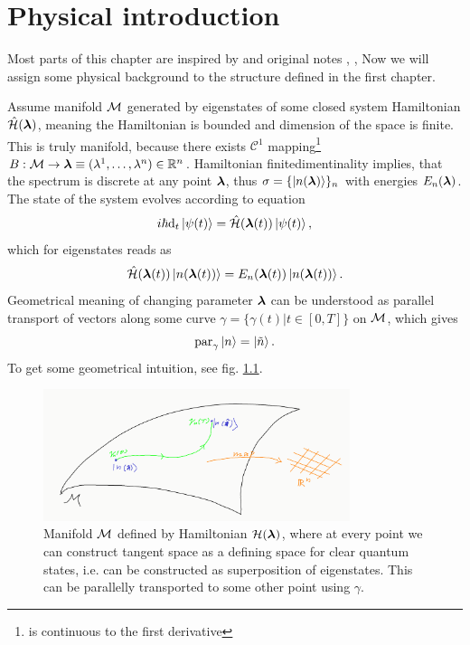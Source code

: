 \chapter{Physical introduction}
Most parts of this chapter are inspired by \citep{kolodrubez} and original notes \citep{berry1984}, \citep{berry1989}, \citep{berry2009}
Now we will assign some physical background to the structure defined in the first chapter.

Assume manifold $\mathcal{M}$ generated by eigenstates of some closed system Hamiltonian $\hat{\mathcal{H}}({\bm\lambda})$, meaning the Hamiltonian is bounded and dimension of the space is finite. This is truly manifold, because there exists $\mathcal{C}^1$ mapping\footnote{is continuous to the first derivative} $B: \mathcal{M}\rightarrow \bm{{\bm\lambda}}\equiv (\lambda^1,\dots,\lambda^n)\in\mathbb{R}^n$. Hamiltonian finitedimentinality implies, that the spectrum is discrete at any point ${\bm\lambda}$, thus $\sigma=\{\ket{n(\bm{{\bm\lambda}})}\}_n$ with energies $E_n(\bm{{\bm\lambda}})$. 
\citep{berry1984} The state of the system evolves according to \Schrodinger equation
\begin{equation}
    i\hbar \mathrm{d}_t\ket{\psi(t)} = \hat{\mathcal{H}}({\bm\lambda}(t))\ket{\psi(t)},
    \label{eq:schrodinger}
\end{equation}
which for eigenstates reads as
\begin{equation}
    \hat{\mathcal{H}}({\bm\lambda}(t))\ket{n({\bm\lambda}(t))}=E_n({\bm\lambda}(t))\ket{n({\bm\lambda}(t))}.
    \label{eq:energySchrodinger}
\end{equation}
Geometrical meaning of changing parameter ${\bm\lambda}$ can be understood as parallel transport of vectors along some curve $\gamma=\{\gamma(t)| t\in[0,T]\}$ on $\mathcal{M}$, which gives
\begin{equation}
    \textrm{par}_\gamma \ket{n} = \ket{\tilde n}.
\end{equation}
To get some geometrical intuition, see fig. \ref{fig:manifoldIntuition}.

\begin{figure}[h]
    \centering
    \includegraphics[width=0.8\textwidth]{../img/manifoldIntuitionTransport.png}
\caption{Manifold $\mathcal{M}$ defined by Hamiltonian $\mathcal{H}({\bm\lambda})$, where at every point we can construct tangent space as a defining space for clear quantum states, i.e. can be constructed as superposition of eigenstates. This can be parallelly transported to some other point using $\gamma$.}
    \label{fig:manifoldIntuition}
\end{figure}


